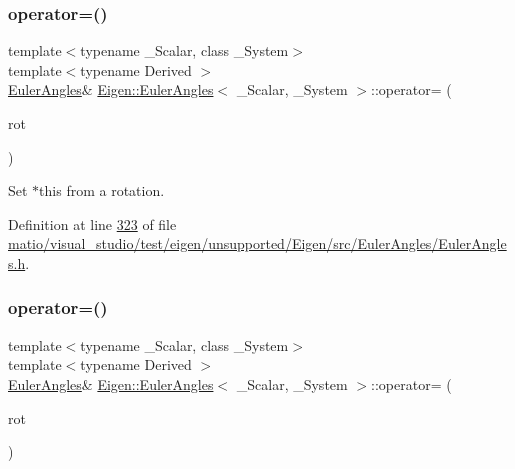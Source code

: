 \subsubsection{\texorpdfstring{operator=()}{operator=()}\hspace{0.1cm}{\footnotesize\ttfamily [3/4]}}
{\footnotesize\ttfamily template$<$typename \+\_\+\+Scalar, class \+\_\+\+System$>$ \\
template$<$typename Derived $>$ \\
\hyperlink{class_eigen_1_1_euler_angles}{Euler\+Angles}\& \hyperlink{class_eigen_1_1_euler_angles}{Eigen\+::\+Euler\+Angles}$<$ \+\_\+\+Scalar, \+\_\+\+System $>$\+::operator= (\begin{DoxyParamCaption}\item[{const \hyperlink{class_eigen_1_1_rotation_base}{Rotation\+Base}$<$ Derived, 3 $>$ \&}]{rot }\end{DoxyParamCaption})\hspace{0.3cm}{\ttfamily [inline]}}

Set {\ttfamily $\ast$this} from a rotation. 

Definition at line \hyperlink{matio_2visual__studio_2test_2eigen_2unsupported_2_eigen_2src_2_euler_angles_2_euler_angles_8h_source_l00323}{323} of file \hyperlink{matio_2visual__studio_2test_2eigen_2unsupported_2_eigen_2src_2_euler_angles_2_euler_angles_8h_source}{matio/visual\+\_\+studio/test/eigen/unsupported/\+Eigen/src/\+Euler\+Angles/\+Euler\+Angles.\+h}.

\mbox{\label{class_eigen_1_1_euler_angles_abc2256872ea7e285cb915b8af82b6810}} 
\subsubsection{\texorpdfstring{operator=()}{operator=()}\hspace{0.1cm}{\footnotesize\ttfamily [4/4]}}
{\footnotesize\ttfamily template$<$typename \+\_\+\+Scalar, class \+\_\+\+System$>$ \\
template$<$typename Derived $>$ \\
\hyperlink{class_eigen_1_1_euler_angles}{Euler\+Angles}\& \hyperlink{class_eigen_1_1_euler_angles}{Eigen\+::\+Euler\+Angles}$<$ \+\_\+\+Scalar, \+\_\+\+System $>$\+::operator= (\begin{DoxyParamCaption}\item[{const \hyperlink{class_eigen_1_1_rotation_base}{Rotation\+Base}$<$ Derived, 3 $>$ \&}]{rot }\end{DoxyParamCaption})\hspace{0.3cm}{\ttfamily [inline]}}

